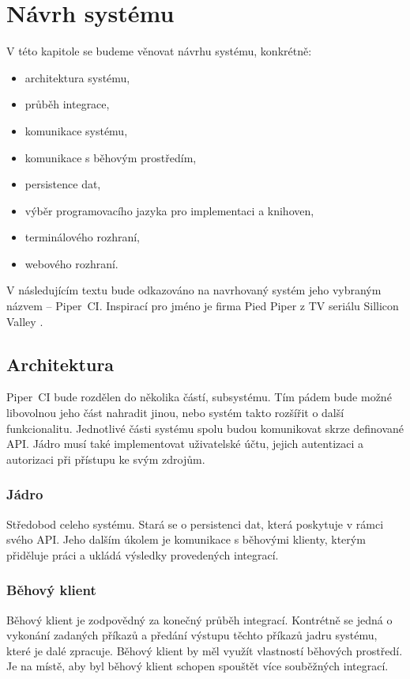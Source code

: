 \chapter{Návrh systému}

V této kapitole se budeme věnovat návrhu systému, konkrétně: 

\begin{itemize}
	\item architektura systému,
	\item průběh integrace,
	\item komunikace systému,
	\item komunikace s běhovým prostředím,
	\item persistence dat,
	\item výběr programovacího jazyka pro implementaci a knihoven,
	\item terminálového rozhraní,
	\item webového rozhraní.
\end{itemize}

V následujícím textu bude odkazováno na navrhovaný systém jeho vybraným názvem -- Piper~CI.
Inspirací pro jméno je firma Pied Piper z TV seriálu Sillicon Valley \cite{pied_piper}.

\section{Architektura}

Piper~CI bude rozdělen do několika částí, subsystému.
Tím pádem bude možné libovolnou jeho část nahradit jinou, nebo systém takto rozšířit o další funkcionalitu.
Jednotlivé části systému spolu budou komunikovat skrze definované API.
Jádro musí také implementovat uživatelské účtu, jejich autentizaci a autorizaci při přístupu ke svým zdrojům.

\subsection{Jádro}

Středobod celeho systému.
Stará se o persistenci dat, která poskytuje v rámci svého API.
Jeho dalším úkolem je komunikace s běhovými klienty, kterým přiděluje práci a ukládá výsledky provedených integrací.

\subsection{Běhový klient}

Běhový klient je zodpovědný za konečný průběh integrací.
Kontrétně se jedná o vykonání zadaných příkazů a předání výstupu těchto příkazů jadru systému, které je dalé zpracuje.
Běhový klient by měl využít vlastností běhových prostředí.
Je na místě, aby byl běhový klient schopen spouštět více souběžných integrací.

